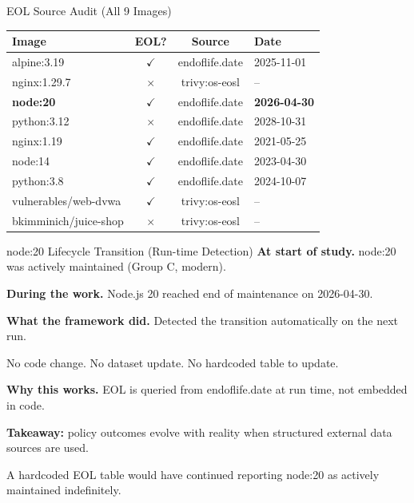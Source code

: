 \documentclass[aspectratio=169]{beamer}
\begin{document}
\begin{frame}{EOL Source Audit (All 9 Images)}
\small
\begin{tabular}{lccl}
\toprule
Image & EOL? & Source & Date \\
\midrule
alpine:3.19 & \textcolor{eolred}{$\checkmark$} & endoflife.date & 2025-11-01 \\
nginx:1.29.7 & \textcolor{passgreen}{$\times$} & trivy:os-eosl & -- \\
\textbf{node:20} & \textcolor{eolred}{\textbf{$\checkmark$}} & endoflife.date & \textbf{2026-04-30} \\
python:3.12 & \textcolor{passgreen}{$\times$} & endoflife.date & 2028-10-31 \\
nginx:1.19 & \textcolor{eolred}{$\checkmark$} & endoflife.date & 2021-05-25 \\
node:14 & \textcolor{eolred}{$\checkmark$} & endoflife.date & 2023-04-30 \\
python:3.8 & \textcolor{eolred}{$\checkmark$} & endoflife.date & 2024-10-07 \\
vulnerables/web-dvwa & \textcolor{eolred}{$\checkmark$} & trivy:os-eosl & -- \\
bkimminich/juice-shop & \textcolor{passgreen}{$\times$} & trivy:os-eosl & -- \\
\bottomrule
\end{tabular}
\end{frame}

\begin{frame}{node:20 Lifecycle Transition (Run-time Detection)}
\textbf{At start of study.} node:20 was actively maintained (Group C, modern).

\medskip
\textbf{During the work.} Node.js 20 reached end of maintenance on 2026-04-30.

\medskip
\textbf{What the framework did.} Detected the transition automatically on the next run.

No code change. No dataset update. No hardcoded table to update.

\medskip
\textbf{Why this works.} EOL is queried from endoflife.date at run time, not embedded in code.

\medskip
\textcolor{accent}{\textbf{Takeaway:} policy outcomes evolve with reality when structured external data sources are used.}

A hardcoded EOL table would have continued reporting node:20 as actively maintained indefinitely.
\end{frame}
\end{document}
